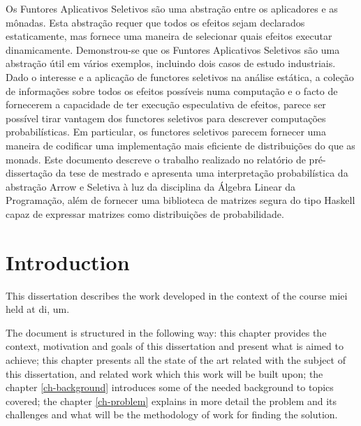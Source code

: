 \documentclass[
  oneside,
  11pt, a4paper,
  footinclude=true,
  headinclude=true,
  cleardoublepage=empty
]{scrbook}
\theoremstyle{definition}
\theoremstyle{definition}
\begin{document}
	Os Funtores Aplicativos Seletivos são uma abstração entre os aplicadores e as mônadas. Esta abstração requer que todos os efeitos sejam declarados estaticamente, mas fornece uma maneira de selecionar quais efeitos executar dinamicamente. Demonstrou-se que os Funtores Aplicativos Seletivos são uma abstração útil em vários exemplos, incluindo dois casos de estudo industriais. Dado o interesse e a aplicação de functores seletivos na análise estática, a coleção de informações sobre todos os efeitos possíveis numa computação e o facto de fornecerem a capacidade de ter execução especulativa de efeitos, parece ser possível tirar vantagem dos functores seletivos para descrever computações probabilísticas. Em particular, os functores seletivos parecem fornecer uma maneira de codificar uma implementação mais eficiente de distribuições do que as monads. Este documento descreve o trabalho realizado no relatório de pré-dissertação da tese de mestrado e apresenta uma interpretação probabilística da abstração Arrow e Seletiva à luz da disciplina da Álgebra Linear da Programação, além de fornecer uma biblioteca de matrizes segura do tipo Haskell capaz de expressar matrizes como distribuições de probabilidade.
	
	\vskip0.5cm
    
	\tableofcontents
	\listoffigures
	\listoftables
	\lstlistoflistings
    \renewcommand{\listtheoremname}{List of theorems and definitions}
	\printglossary[type=\acronymtype]
	\clearpage
	\thispagestyle{empty}

	
	
	\chapter{Introduction}
        This dissertation describes the work developed in the context of the course \gls{miei} held at \gls{di}, \gls{um}.
        
        The document is structured in the following way: this chapter provides the context, motivation and goals of this dissertation and present what is aimed to achieve; this chapter presents all the state of the art related with the subject of this dissertation, and related work which this work will be built upon; the chapter \ref{ch-background} introduces some of the needed background to topics covered; the chapter \ref{ch-problem} explains in more detail the problem and its challenges and what will be the methodology of work for finding the solution.
		
\end{document}
